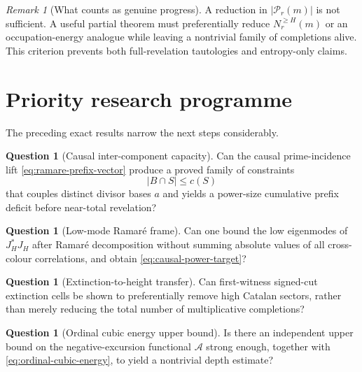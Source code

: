 \documentclass[11pt]{amsart}
\numberwithin{equation}{section}
\theoremstyle{plain}
\theoremstyle{definition}
\newtheorem{question}[theorem]{Question}
\theoremstyle{remark}
\newtheorem{remark}[theorem]{Remark}
\begin{document}
\begin{remark}[What counts as genuine progress]
\label{rem:genuine-progress}
A reduction in $|\mathcal P_r(m)|$ is not sufficient.  A useful partial theorem must preferentially reduce
$N_r^{\ge H}(m)$ or an occupation-energy analogue while leaving a nontrivial family of completions alive.  This criterion prevents both
full-revelation tautologies and entropy-only claims.
\end{remark}

\section{Priority research programme}
\label{sec:priority-programme}

The preceding exact results narrow the next steps considerably.

\begin{question}[Causal inter-component capacity]
\label{question:causal-capacity}
Can the causal prime-incidence lift \eqref{eq:ramare-prefix-vector} produce a proved family of constraints
\begin{equation}
|B\cap S|\le c(S)
\label{eq:causal-capacity-question}
\end{equation}
that couples distinct divisor bases $a$ and yields a power-size cumulative prefix deficit before near-total revelation?
\end{question}

\begin{question}[Low-mode Ramar\'e frame]
\label{question:low-mode-frame}
Can one bound the low eigenmodes of $J_H^*J_H$ after Ramar\'e decomposition without summing absolute values of all cross-colour
correlations, and obtain \eqref{eq:causal-power-target}?
\end{question}

\begin{question}[Extinction-to-height transfer]
\label{question:extinction-height}
Can first-witness signed-cut extinction cells be shown to preferentially remove high Catalan sectors, rather than merely reducing the total
number of multiplicative completions?
\end{question}

\begin{question}[Ordinal cubic energy upper bound]
\label{question:ordinal-upper}
Is there an independent upper bound on the negative-excursion functional $\mathcal A$ strong enough, together with
\eqref{eq:ordinal-cubic-energy}, to yield a nontrivial depth estimate?
\end{question}
\end{document}
